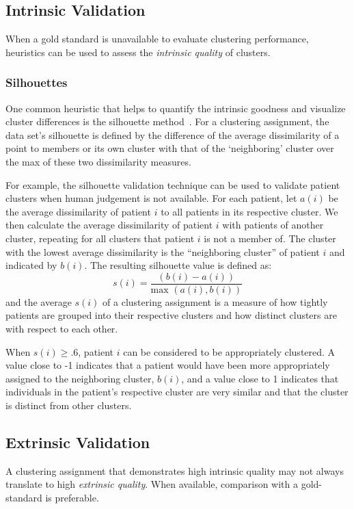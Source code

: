 \subsection{Intrinsic Validation}
When a gold standard is unavailable to evaluate clustering performance, heuristics can be used to assess the \emph{intrinsic quality} of clusters.  

\subsubsection{Silhouettes}
One common heuristic that helps to quantify the intrinsic goodness and visualize cluster differences is the silhouette method~\cite{Rousseeuw}.  For a clustering assignment, the data set's silhouette is defined by the difference of the average dissimilarity of a point to members or its own cluster with that of the `neighboring' cluster over the max of these two dissimilarity measures.

For example, the silhouette validation technique can be used to validate patient clusters when human judgement is not available. For each patient, let $a(i)$ be the average dissimilarity of patient $i$ to all patients in its respective cluster.  We then calculate the average dissimilarity of patient $i$ with patients of another cluster, repeating for all clusters that patient $i$ is not a member of.  The cluster with the lowest average dissimilarity is the ``neighboring cluster'' of patient $i$ and indicated by $b(i)$. The resulting silhouette value is defined as:
$$s(i) = \frac{(b(i)-a(i))}{\mbox{max }{(a(i),b(i))}}$$
and the average $s(i)$ of a clustering assignment is a measure of how tightly patients are grouped into their respective clusters and how distinct clusters are with respect to each other.

When $s(i) \geq .6$, patient $i$ can be considered to be appropriately clustered.  A value close to -1 indicates that a patient would have been more appropriately assigned to the neighboring cluster, $b(i)$, and a value close to 1 indicates that individuals in the patient's respective cluster are very similar and that the cluster is distinct from other clusters.

\subsection{Extrinsic Validation}
 A clustering assignment that demonstrates high intrinsic quality may not always translate to high \emph{extrinsic quality}.  When available, comparison with a gold-standard is preferable.

